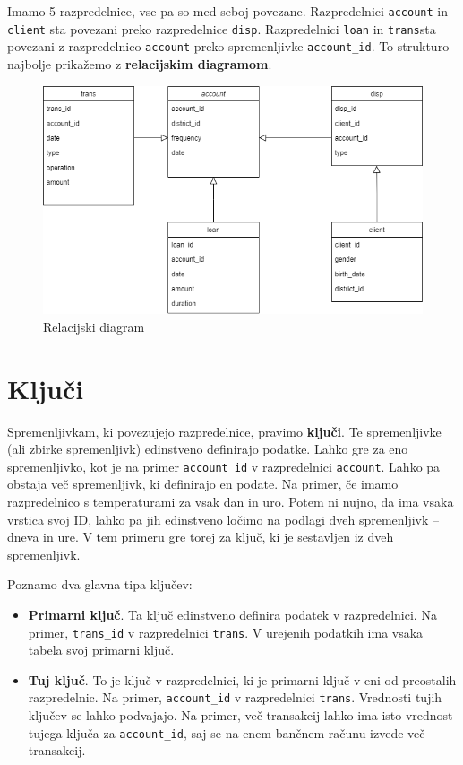 \documentclass[
]{book}
\providecommand{\tightlist}{%
  \setlength{\itemsep}{0pt}\setlength{\parskip}{0pt}}
\begin{document}
Imamo 5 razpredelnice, vse pa so med seboj povezane. Razpredelnici \texttt{account} in \texttt{client} sta povezani preko razpredelnice \texttt{disp}. Razpredelnici \texttt{loan} in \texttt{trans}sta povezani z razpredelnico \texttt{account} preko spremenljivke \texttt{account\_id}. To strukturo najbolje prikažemo z \textbf{relacijskim diagramom}.

\begin{figure}
\centering
\includegraphics{./png/financial1.png}
\caption{Relacijski diagram}
\end{figure}

\hypertarget{kljuux10di}{%
\section{Ključi}\label{kljuux10di}}

Spremenljivkam, ki povezujejo razpredelnice, pravimo \textbf{ključi}. Te spremenljivke (ali zbirke spremenljivk) edinstveno definirajo podatke. Lahko gre za eno spremenljivko, kot je na primer \texttt{account\_id} v razpredelnici \texttt{account}. Lahko pa obstaja več spremenljivk, ki definirajo en podate. Na primer, če imamo razpredelnico s temperaturami za vsak dan in uro. Potem ni nujno, da ima vsaka vrstica svoj ID, lahko pa jih edinstveno ločimo na podlagi dveh spremenljivk -- dneva in ure. V tem primeru gre torej za ključ, ki je sestavljen iz dveh spremenljivk.

Poznamo dva glavna tipa ključev:

\begin{itemize}
\tightlist
\item
  \textbf{Primarni ključ}. Ta ključ edinstveno definira podatek v razpredelnici. Na primer, \texttt{trans\_id} v razpredelnici \texttt{trans}. V urejenih podatkih ima vsaka tabela svoj primarni ključ.
\item
  \textbf{Tuj ključ}. To je ključ v razpredelnici, ki je primarni ključ v eni od preostalih razpredelnic. Na primer, \texttt{account\_id} v razpredelnici \texttt{trans}. Vrednosti tujih ključev se lahko podvajajo. Na primer, več transakcij lahko ima isto vrednost tujega ključa za \texttt{account\_id}, saj se na enem bančnem računu izvede več transakcij.
\end{itemize}
\end{document}
